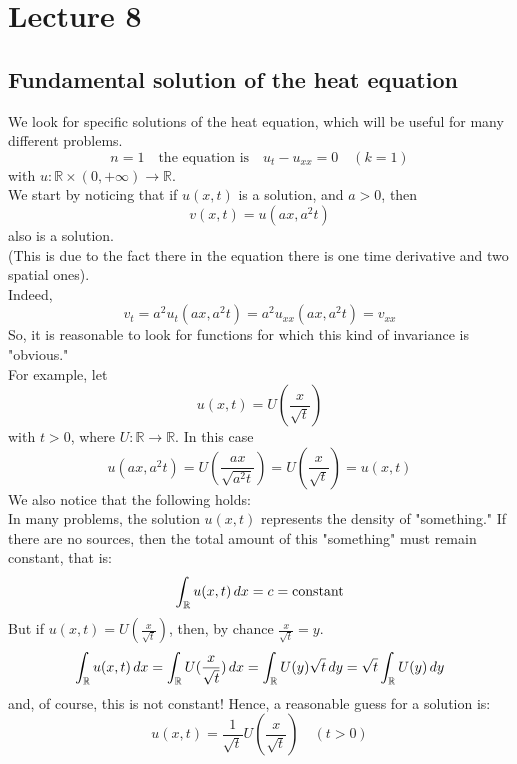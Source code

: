 \section{Lecture 8}
\subsection{Fundamental solution of the heat equation}
We look for specific solutions of the heat equation, which will be useful for many different problems. 
\begin{equation*}
    n= 1 \quad \text{the equation is} \quad u_t - u_{xx}=0 \quad (k=1)
\end{equation*}
with $u: \mathbb{R} \times (0,+\infty) \rightarrow \mathbb{R}$. \\
We start by noticing that if $u(x,t)$ is a solution, and $a > 0$, then
\begin{equation*}
    v(x,t) = u(ax,a^2t)
\end{equation*}
also is a solution. \\
(This is due to the fact there in the equation there is one time derivative and two spatial ones). \\
Indeed,
\begin{equation*}
    v_t = a^2 u_t(ax,a^2t) = a^2 u_{xx}(ax,a^2t) = v_{xx}
\end{equation*}
So, it is reasonable to look for functions for which this kind of invariance is "obvious." \\
For example, let 
\begin{equation*}
     u(x,t) = U(\frac{x}{\sqrt{t}})
\end{equation*} 
with $t>0$, where \( U: \mathbb{R} \to \mathbb{R} \). In this case
\begin{equation*}
    u(ax, a^2 t)= U (\frac{ax}{\sqrt{a^2t}})= U(\frac{x}{\sqrt{t}})= u(x,t)
\end{equation*}
We also notice that the following holds:\\
In many problems, the solution \( u(x,t) \) represents the density of "something." If there are no sources, then the total amount of this "something" must remain constant, that is:
\[
    \int_{\mathbb{R}} u(x,t) \, dx = c= \text{constant}
\]
But if $u(x,t)=U(\frac{x}{\sqrt{t}})$, then, by chance $\frac{x}{\sqrt{t}}=y$.
\[
\int_{\mathbb{R}} u(x,t) \, dx = \int_{\mathbb{R}} U(\frac{x}{\sqrt{t}}) \, dx = \int_{\mathbb{R}} U(y)\sqrt{t} \, dy = \sqrt{t} \int_{\mathbb{R}} U(y) \, dy
\]
and, of course, this is not constant! Hence, a reasonable guess for a solution is:
\[
u(x,t) = \frac{1}{\sqrt{t}}U(\frac{x}{\sqrt{t}}) \quad (t > 0)
\]

